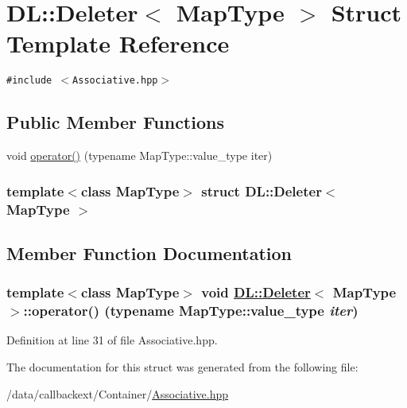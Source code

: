 \hypertarget{structDL_1_1Deleter}{
\section{DL::Deleter$<$ Map\-Type $>$ Struct Template Reference}
\label{structDL_1_1Deleter}
}
{\tt \#include $<$Associative.hpp$>$}

\subsection*{Public Member Functions}
\begin{CompactItemize}
\item 
void \hyperlink{structDL_1_1Deleter_a0}{operator()} (typename Map\-Type::value\_\-type iter)
\end{CompactItemize}
\subsubsection*{template$<$class Map\-Type$>$ struct DL::Deleter$<$ Map\-Type $>$}



\subsection{Member Function Documentation}
\hypertarget{structDL_1_1Deleter_a0}{
\subsubsection[operator()]{\setlength{\rightskip}{0pt plus 5cm}template$<$class Map\-Type$>$ void \hyperlink{structDL_1_1Deleter}{DL::Deleter}$<$ Map\-Type $>$::operator() (typename Map\-Type::value\_\-type {\em iter})}}
\label{structDL_1_1Deleter_a0}




Definition at line 31 of file Associative.hpp.

The documentation for this struct was generated from the following file:\begin{CompactItemize}
\item 
/data/callbackext/Container/\hyperlink{Associative_8hpp}{Associative.hpp}\end{CompactItemize}
